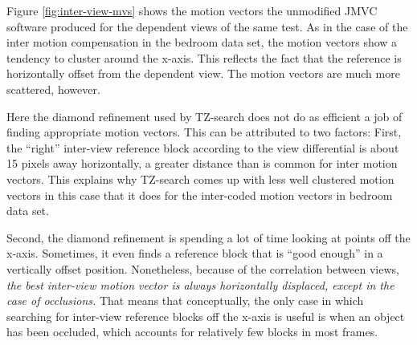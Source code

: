 \documentclass{sig-alternate-05-2015}
\begin{document}
Figure \ref{fig:inter-view-mvs} shows the motion vectors the unmodified JMVC
software produced for the dependent views of the same test. As in the case
of the inter motion compensation in the bedroom data set, the motion vectors
show a tendency to cluster around the x-axis. This reflects the fact that the
reference is horizontally offset from the dependent view. The motion vectors
are much more scattered, however.

Here the diamond refinement used by TZ-search does not do as efficient a job of
finding appropriate motion vectors. This can be attributed to two factors: First,
the ``right'' inter-view reference block according to the view differential is
about 15 pixels away horizontally, a greater distance than is common for
inter motion vectors. This explains why TZ-search comes up with less
well clustered motion vectors in this case that it does for the inter-coded
motion vectors in bedroom data set.

Second, the diamond refinement is spending a lot of time looking at points off
the x-axis. Sometimes, it even finds a reference block that is ``good enough''
in a vertically offset position. Nonetheless, because of the correlation between
views, {\it the best inter-view motion vector is always horizontally displaced,
except in the case of occlusions.} That means that conceptually, the only case in
which searching for inter-view reference blocks off the x-axis is useful is when
an object has been occluded, which accounts for relatively few blocks in most
frames.
\end{document}
